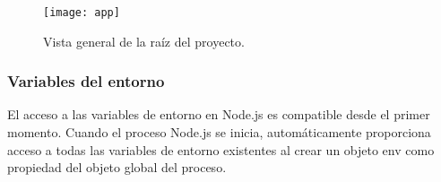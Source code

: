 \begin{figure}[H]
  \centering
  \texttt{[image: app]}
  \caption{Vista general de la raíz del proyecto.}
\end{figure}

\newpage
\subsubsection{Variables del entorno}
El acceso a las variables de entorno en Node.js es compatible desde el primer momento. Cuando el proceso Node.js se inicia, automáticamente proporciona acceso a todas las variables de entorno existentes al crear un objeto env como propiedad del objeto global del proceso.
\vspace{0.8cm}


